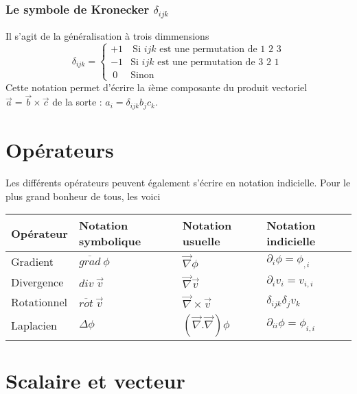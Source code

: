         \subsubsection{Le symbole de Kronecker $\delta_{ijk}$}
        Il s'agit de la généralisation à trois dimmensions
        \begin{equation}
        \delta_{ijk} = \left\{\begin{array}{ll}
         +1&\ \text{Si $ijk$ est une permutation de 1 2 3}  \\
         -1&  \text{Si $ijk$ est une permutation de 3 2 1}\\
         \ 0& \text{Sinon}
        \end{array}\right.
        \end{equation}
        Cette notation permet d'écrire la $i$ème composante du produit vectoriel $\vec{a}=\vec{b}\times
        \vec{c}$ de la sorte : $a_i = \delta_{ijk}b_jc_k$.
        
        
        
        
        
        
\section{Opérateurs}
    Les différents opérateurs peuvent également s'écrire en notation indicielle. Pour le plus grand 
    bonheur de tous, les voici
    
    \begin{center}
    \begin{tabularx}{10cm}{|X|X|X|X|}
        \hline 
        Opérateur & Notation symbolique& Notation usuelle & Notation indicielle \tabularnewline 
        \hline 
        Gradient & $\overline{grad}\ \phi$ & $\vec{\nabla}\phi$ & $\partial_i \phi = \phi_{,i}$\tabularnewline 
        \hline 
        Divergence & $div\ \vec{v}$ & $\vec{\nabla}\vec{v}$ & $\partial_i v_i = v_{i,i}$\tabularnewline
        \hline
        Rotationnel & $\overline{rot}\ \vec{v}$ & $\vec{\nabla}\times \vec{v}$ & $\delta_{ijk}\delta_j v_k$\tabularnewline
        \hline
        Laplacien & $\Delta \phi$ & $(\vec{\nabla}.\vec{\nabla})\phi$ & $\partial_{ii} \phi 
        = \phi_{i,i}$\tabularnewline
        \hline
        \end{tabularx}
    \label{tab:comparaison}
    \end{center}
    
\section{Scalaire et vecteur}

